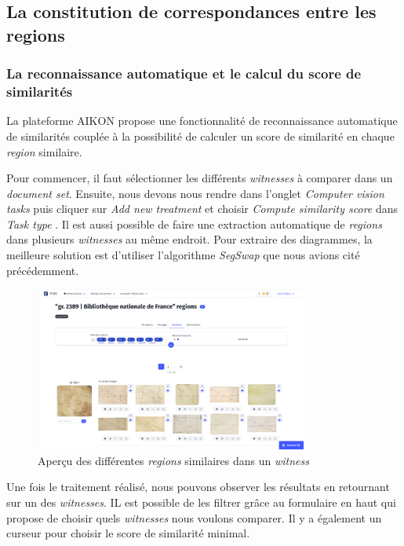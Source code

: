 \subsection{La constitution de correspondances entre les regions}

\subsubsection{La reconnaissance automatique et le calcul du score de similarités}

La plateforme AIKON propose une fonctionnalité de reconnaissance automatique de similarités couplée à la possibilité de calculer un score de similarité en chaque \textit{region} similaire. 

Pour commencer, il faut sélectionner les différents \textit{witnesses} à comparer dans un \textit{document set}. Ensuite, nous devons nous rendre dans l'onglet \og \textit{Computer vision tasks} \fg puis cliquer sur \og \textit{Add new treatment} \fg et choisir \og \textit{Compute similarity score} \fg dans \og \textit{Task type} \fg. Il est aussi possible de faire une extraction automatique de \textit{regions} dans plusieurs \textit{witnesses} au même endroit. Pour extraire des diagrammes, la meilleure solution est d'utiliser l'algorithme \textit{SegSwap} que nous avions cité précédemment. 

\begin{figure}[H]
	\centering
	\includegraphics[width=0.8\textwidth]{images/similarities.png}
	\caption{Aperçu des différentes \textit{regions} similaires dans un \textit{witness}}
	\label{fig:apercu_similarites}
\end{figure}

Une fois le traitement réalisé, nous pouvons observer les résultats en retournant sur un des \textit{witnesses}. 
IL est possible de les filtrer grâce au formulaire en haut qui propose de choisir quels \textit{witnesses} nous voulons comparer. Il y a également un curseur pour choisir le score de similarité minimal.

